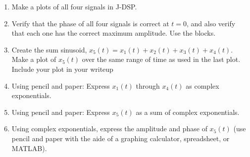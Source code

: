 \begin{enumerate}\renewcommand{\theenumi}{\alph{enumi}}
\item Make a plots of all four signals in J-DSP. 

\item Verify that the phase of all four signals is correct at $t = 0$,
  and also verify that each one has the correct maximum amplitude. Use
  the  blocks.

\item Create the sum sinusoid,
  $x_5(t)=x_1(t)+x_2(t)+x_3(t)+x_4(t)$. Make a plot of $x_5(t)$ over
  the same range of time as used in the last plot. Include your plot in your writeup 
  
\item Using pencil and paper: Express   $x_1(t)$ through $x_4(t)$ as complex exponentials. 
  
	
\item Using pencil and paper: Express   $x_5(t)$ as a sum of complex exponentials. 	


\item Using complex exponentials, express the amplitude and phase of $x_5(t)$ (use pencil and paper with the aide of a graphing calculator, spreadsheet, or MATLAB).


\end{enumerate}



